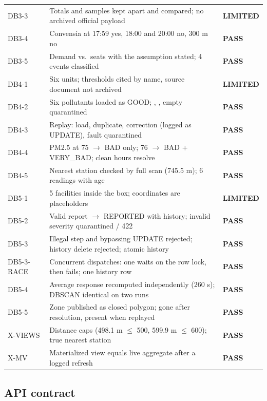 \documentclass[11pt,a4paper]{article}
\newcommand{\pass}{\textcolor{passg}{\textbf{PASS}}}
\newcommand{\limited}{\textcolor{limo}{\textbf{LIMITED}}}
\newcommand{\ra}{\ensuremath{\rightarrow}}
\begin{document}
\begin{xltabular}{\linewidth}{@{}p{2.1cm}Xp{1.45cm}@{}}
DB3-3 & Totals and samples kept apart and compared; no archived official payload & \limited \\
DB3-4 & Convensia at 17:59 yes, 18:00 and 20:00 no, 300 m no & \pass \\
DB3-5 & Demand vs.\ seats with the assumption stated; 4 events classified & \pass \\
DB4-1 & Six units; thresholds cited by name, source document not archived & \limited \\
DB4-2 & Six pollutants loaded as GOOD; \code{-}, , empty quarantined & \pass \\
DB4-3 & Replay: load, duplicate, correction (logged as UPDATE), fault quarantined & \pass \\
DB4-4 & PM2.5 at 75 \ra{} BAD only; 76 \ra{} BAD + VERY\_BAD; clean hours resolve & \pass \\
DB4-5 & Nearest station checked by full scan (745.5 m); 6 readings with age & \pass \\
DB5-1 & 5 facilities inside the box; coordinates are placeholders & \limited \\
DB5-2 & Valid report \ra{} REPORTED with history; invalid severity quarantined / 422 & \pass \\
DB5-3 & Illegal step and bypassing UPDATE rejected; history delete rejected; atomic history & \pass \\
DB5-3-RACE & Concurrent dispatches: one waits on the row lock, then fails; one history row & \pass \\
DB5-4 & Average response recomputed independently (260 s); DBSCAN identical on two runs & \pass \\
DB5-5 & Zone published as closed polygon; gone after resolution, present when replayed & \pass \\
X-VIEWS & Distance caps (498.1 m $\le$ 500, 599.9 m $\le$ 600); true nearest station & \pass \\
X-MV & Materialized view equals live aggregate after a logged refresh & \pass \\
\end{xltabular}
\endgroup

\subsection{API contract}
\end{document}
